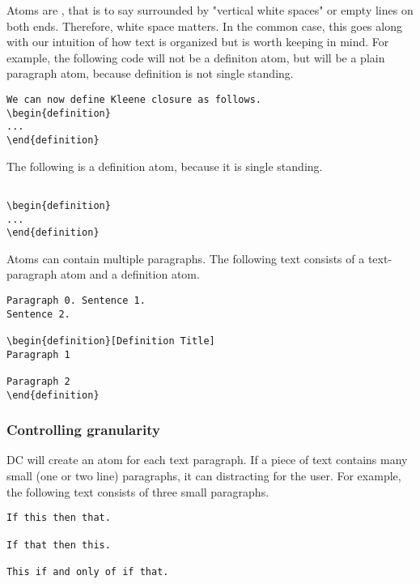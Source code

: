 \begin{important}
Atoms are , that is to say surrounded by "vertical
white spaces" or empty lines on both ends.
%
Therefore,  white space  matters. In the common case, this goes along with our intuition of how text is organized but is worth keeping in mind. For example, the following code will not be a definiton atom, but will be a plain paragraph atom, because definition is not single standing.

\begin{lstlisting}
We can now define Kleene closure as follows.
\begin{definition}
...
\end{definition}
\end{lstlisting}

The following is a definition atom, because it is single standing.
\begin{lstlisting}

\begin{definition}
...
\end{definition}

\end{lstlisting}
\end{important}

\begin{note}
Atoms can contain multiple paragraphs.  The following text consists of a text-paragraph atom and a definition atom.


\begin{lstlisting}
Paragraph 0. Sentence 1.
Sentence 2.

\begin{definition}[Definition Title]
Paragraph 1

Paragraph 2
\end{definition}
\end{lstlisting}
\end{note}

\subsubsection{Controlling granularity}

DC will create an atom for each text paragraph.  If a piece of text contains many small (one or two line) paragraphs, it can distracting for the user.  For example, the following text consists of three small paragraphs.
%
\begin{lstlisting}
If this then that.

If that then this.

This if and only of if that.
\end{lstlisting}

